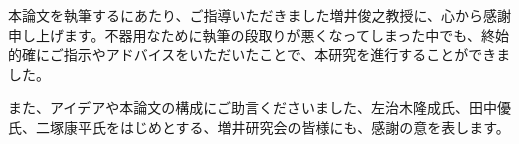 \begin{acknowledgment}

    本論文を執筆するにあたり、ご指導いただきました増井俊之教授に、心から感謝申し上げます。不器用なために執筆の段取りが悪くなってしまった中でも、終始的確にご指示やアドバイスをいただいたことで、本研究を進行することができました。
    
    また、アイデアや本論文の構成にご助言くださいました、左治木隆成氏、田中優氏、二塚康平氏をはじめとする、増井研究会の皆様にも、感謝の意を表します。

\end{acknowledgment}

